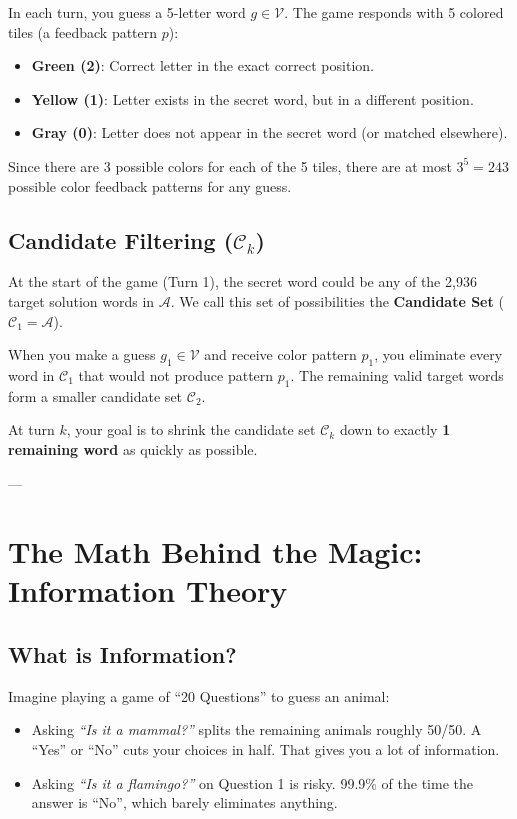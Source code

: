 \documentclass[11pt,a4paper]{article}
\begin{document}
In each turn, you guess a 5-letter word $g \in \mathcal{V}$. The game responds with 5 colored tiles (a feedback pattern $p$):
\begin{itemize}[itemsep=3pt]
    \item \textbf{Green (2)}: Correct letter in the exact correct position.
    \item \textbf{Yellow (1)}: Letter exists in the secret word, but in a different position.
    \item \textbf{Gray (0)}: Letter does not appear in the secret word (or matched elsewhere).
\end{itemize}

Since there are 3 possible colors for each of the 5 tiles, there are at most $3^5 = 243$ possible color feedback patterns for any guess.

\subsection{\texorpdfstring{Candidate Filtering ($\mathcal{C}_k$)}{Candidate Filtering}}
At the start of the game (Turn 1), the secret word could be any of the 2,936 target solution words in $\mathcal{A}$. We call this set of possibilities the \textbf{Candidate Set} ($\mathcal{C}_1 = \mathcal{A}$).

When you make a guess $g_1 \in \mathcal{V}$ and receive color pattern $p_1$, you eliminate every word in $\mathcal{C}_1$ that would not produce pattern $p_1$. The remaining valid target words form a smaller candidate set $\mathcal{C}_2$.

At turn $k$, your goal is to shrink the candidate set $\mathcal{C}_k$ down to exactly \textbf{1 remaining word} as quickly as possible.

---

\section{The Math Behind the Magic: Information Theory}

\subsection{What is Information?}
Imagine playing a game of ``20 Questions'' to guess an animal:
\begin{itemize}[itemsep=2pt]
    \item Asking \textit{``Is it a mammal?''} splits the remaining animals roughly 50/50. A ``Yes'' or ``No'' cuts your choices in half. That gives you a lot of information.
    \item Asking \textit{``Is it a flamingo?''} on Question 1 is risky. 99.9\% of the time the answer is ``No'', which barely eliminates anything.
\end{itemize}
\end{document}

